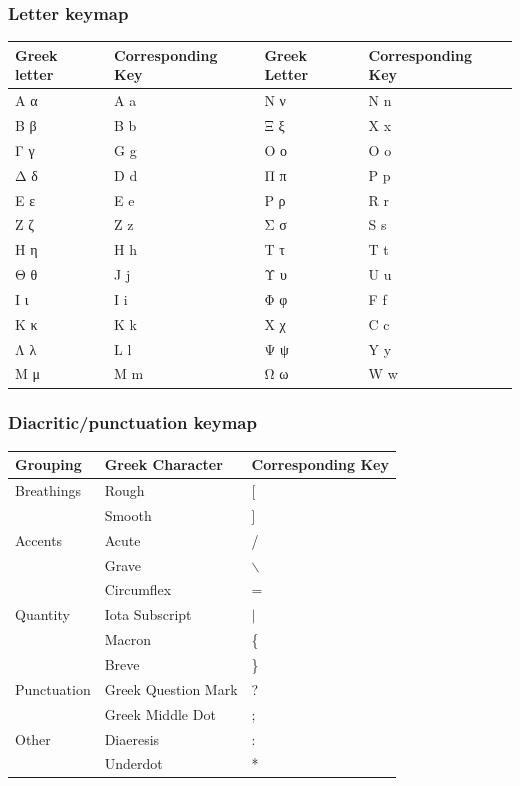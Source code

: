 \documentclass[11pt]{article}
\begin{document}
\subsubsection{Letter keymap}
\label{sec:org1c2ed23}

\begin{center}
\begin{tabular}{ll|ll}
Greek letter & Corresponding Key & Greek Letter & Corresponding Key\\
\hline
Α α & A a & Ν ν & N n\\
Β β & B b & Ξ ξ & X x\\
Γ γ & G g & Ο ο & O o\\
Δ δ & D d & Π π & P p\\
Ε ε & E e & Ρ ρ & R r\\
Ζ ζ & Z z & Σ σ & S s\\
Η η & H h & Τ τ & T t\\
Θ θ & J  j & Υ υ & U u\\
Ι ι & I i & Φ φ & F f\\
Κ κ & K k & Χ χ & C c\\
Λ λ & L l & Ψ ψ & Y y\\
Μ μ & M m & Ω ω & W w\\
\end{tabular}
\end{center}

\subsubsection{Diacritic/punctuation keymap}
\label{sec:org34fc2cb}

\begin{center}
\begin{tabular}{lll}
Grouping & Greek Character & Corresponding Key\\
\hline
Breathings & Rough & [\\
 & Smooth & ]\\
Accents & Acute & /\\
 & Grave & $\backslash$\\
 & Circumflex & =\\
Quantity & Iota Subscript & \(\vert{}\)\\
 & Macron & \{\\
 & Breve & \}\\
Punctuation & Greek Question Mark & ?\\
 & Greek Middle Dot & ;\\
Other & Diaeresis & :\\
 & Underdot & *\\
\end{tabular}
\end{center}
\end{document}
